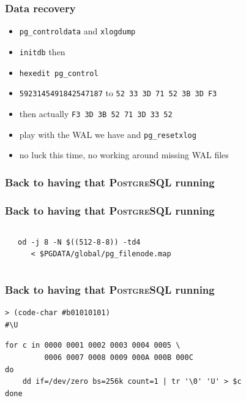 \documentclass{beamer}
\begin{document}
\begin{frame}[fragile]
  \frametitle{Data recovery}


  \vfill  
  \begin{itemize}
  \item \texttt{pg\_controldata} and \texttt{xlogdump}
  \item \texttt{initdb} then
  \item \texttt{hexedit pg\_control}
  \item \texttt{5923145491842547187} to \texttt{52 33 3D 71 52 3B 3D F3}
  \item then actually \texttt{F3 3D 3B 52 71 3D 33 52}
  \item play with the WAL we have and \texttt{pg\_resetxlog}
  \item no luck this time, no working around missing WAL files
  \end{itemize}
\end{frame}

\begin{frame}
  \frametitle{Back to having that \textsc{PostgreSQL} running}

  \vfill
\end{frame}

\begin{frame}[fragile]
  \frametitle{Back to having that \textsc{PostgreSQL} running}
  
  \vfill

  \begin{columns}[c]
    \\
\begin{verbatim}
od -j 8 -N $((512-8-8)) -td4
   < $PGDATA/global/pg_filenode.map
\end{verbatim}
  \end{columns}
\end{frame}

\begin{frame}[fragile]
  \frametitle{Back to having that \textsc{PostgreSQL} running}

  \vfill

\begin{verbatim}
> (code-char #b01010101)
#\U
\end{verbatim}

\vfill
\begin{verbatim}
for c in 0000 0001 0002 0003 0004 0005 \
         0006 0007 0008 0009 000A 000B 000C
do
    dd if=/dev/zero bs=256k count=1 | tr '\0' 'U' > $c
done
\end{verbatim}
\end{frame}
\end{document}
